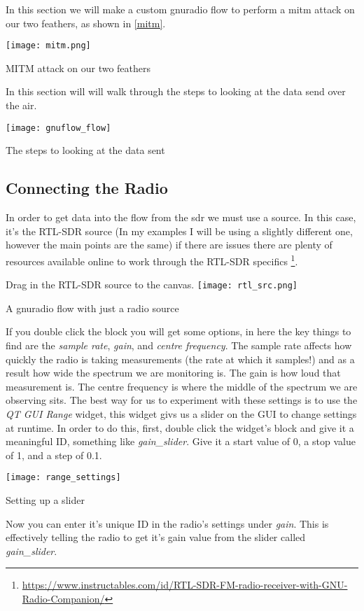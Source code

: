 In this section we will make a custom gnuradio flow to perform a \gls{mitm} attack on our two feathers, as shown in \cref{mitm}.

\centrefigurestart
\texttt{[image: mitm.png]}
\caption{MITM attack on our two feathers}
\label{mitm}
\centrefigureend

In this section will will walk through the steps to looking at the data send over the air.

\centrefigurestart
\texttt{[image: gnuflow\_flow]}
\caption{The steps to looking at the data sent}
\label{mitm}
\centrefigureend


\subsection{Connecting the Radio}
In order to get data into the flow from the \gls{sdr} we must use a source. In this case, it's the RTL-SDR source (In my examples I will be using a slightly different one, however the main points are the same) if there are issues there are plenty of resources available online to work through the RTL-SDR specifics \footnote{\url{https://www.instructables.com/id/RTL-SDR-FM-radio-receiver-with-GNU-Radio-Companion/}}.

Drag in the RTL-SDR source to the canvas.
\centrefigurestart
\texttt{[image: rtl\_src.png]}
\caption{A gnuradio flow with just a radio source}
\centrefigureend

If you double click the block you will get some options, in here the key things to find are the \textit{sample rate}, \textit{gain}, and \textit{centre frequency}. The sample rate affects how quickly the radio is taking measurements (the rate at which it samples!) and as a result how wide the spectrum we are monitoring is. The gain is how loud that measurement is. The centre frequency is where the middle of the spectrum we are observing sits. The best way for us to experiment with these settings is to use the \textit{QT GUI Range} widget, this widget givs us a slider on the GUI to change settings at runtime. In order to do this, first, double click the widget's block and give it a meaningful ID, something like \textit{gain\_slider}. Give it a start value of 0, a stop value of 1, and a step of 0.1.

\centrefigurestart
\texttt{[image: range\_settings]}
\caption{Setting up a slider}
\centrefigureend

Now you can enter it's unique ID in the radio's settings under \textit{gain}. This is effectively telling the radio to get it's gain value from the slider called \textit{gain\_slider}.


